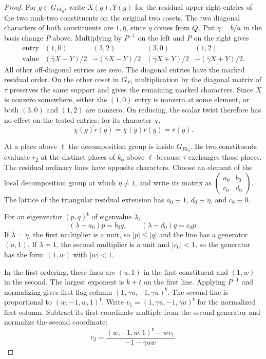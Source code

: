 \begin{proof}
For \(g\in G_{Fk_0}\), write \(X(g),Y(g)\) for the
residual upper-right entries of the two rank-two
constituents on the original two cosets. The two
diagonal characters of both constituents are
\(1,\bar\eta\), since \(\eta\) comes from \(Q\).
Put \(\gamma=b/a\) in the basis change \(P\) above.
Multiplying by \(P^{-1}\) on the left and \(P\) on the
right gives
\[
\begin{array}{c|rrrr}
\text{entry} &(1,0)&(3,2)&(3,0)&(1,2)\\ \hline
\text{value}&
(\bar\gamma X-Y)/2 &-(\bar\gamma X-Y)/2&
(\bar\gamma X+Y)/2 &-(\bar\gamma X+Y)/2 .
\end{array}
\]
All other off-diagonal entries are zero. The diagonal
entries have the marked residual order. On the other
coset in \(G_F\), multiplication by the diagonal matrix
of \(\tau\) preserves the same support and gives the
remaining marked characters. Since \(X\) is nonzero
somewhere, either the \((1,0)\) entry is nonzero at some
element, or both \((3,0)\) and \((1,2)\) are nonzero.
On reducing, the scalar twist therefore has no effect on the tested entries: for its character \(\chi\),
\[
 \overline{\chi(g)r(g)}=\bar\chi(g)\bar r(g)=\bar r(g).
\]

At a place above \(\ell\) the decomposition group is
inside \(G_{Fk_0}\). Its two constituents evaluate
\(r_2\) at the distinct places of \(k_0\) above \(\ell\)
because \(\tau\) exchanges those places. The residual
ordinary lines have opposite characters. Choose an element of the local decomposition group at which
\(\bar\eta\ne1\), and write its matrix as
\(\left(\begin{smallmatrix}a_0&b_0\\c_0&d_0\end{smallmatrix}\right)\).
The lattice of the triangular residual extension has
\(a_0\equiv1\), \(d_0\equiv\eta\), and \(c_0\equiv0\).

For an eigenvector \((p,q)^{\mathsf t}\) of eigenvalue \(\lambda\),
\[
       (\lambda-a_0)p=b_0 q,\qquad
       (\lambda-d_0)q=c_0 p.
\]
If \(\bar\lambda=\bar\eta\), the first multiplier is a unit,
so \(|p|\le|q|\) and the line has a generator \((u,1)\).
If \(\bar\lambda=1\), the second multiplier is a unit and
\(|c_0|<1\), so the generator has the form \((1,w)\) with
\(|w|<1\).

In the first ordering, these lines are \((u,1)\) in
the first constituent and \((1,w)\) in the second.
The largest exponent is \(k+t\) on the first line.
Applying \(P^{-1}\) and normalizing gives first flag
column \((1,\gamma u,-1,\gamma u)^{\mathsf t}\).
The second line is proportional to
\((w,-1,w,1)^{\mathsf t}\).
Write \(v_1=(1,\gamma u,-1,\gamma u)^{\mathsf t}\) for the normalized first column. Subtract its first-coordinate multiple from the second generator and normalize the second coordinate:
\[
 v_2=\frac{(w,-1,w,1)^{\mathsf t}-wv_1}{-1-\gamma uw}.
\]


\end{proof}
